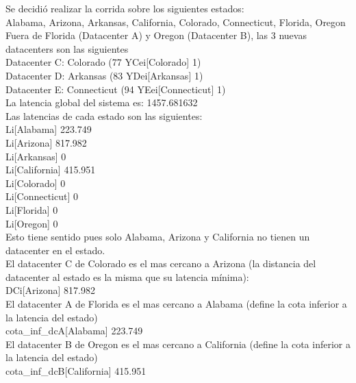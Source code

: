 \documentclass{article}
\begin{document}
Se decidi\'o realizar la corrida sobre los siguientes estados:
\smallskip\\
Alabama, Arizona, Arkansas, California, Colorado, Connecticut, Florida, Oregon
\bigskip\\
Fuera de Florida (Datacenter A) y Oregon (Datacenter B), las 3 nuevas datacenters son las siguientes
\bigskip\\
Datacenter C: Colorado        (77 YCei[Colorado]      1)
\smallskip\\
Datacenter D: Arkansas        (83 YDei[Arkansas]      1)     	
\smallskip\\
Datacenter E: Connecticut     (94 YEei[Connecticut]   1)   
\bigskip\\
La latencia global del sistema es: 1457.681632
\bigskip\\
Las latencias de cada estado son las siguientes:
\bigskip\\
Li[Alabama]       223.749        
\smallskip\\     
Li[Arizona]       817.982       
\smallskip\\      
Li[Arkansas]      0            
\smallskip\\ 
Li[California]    415.951     
\smallskip\\  
Li[Colorado]      0         
\smallskip\\    
Li[Connecticut]   0     
\smallskip\\        
Li[Florida]       0   
\smallskip\\          
Li[Oregon]        0             
\bigskip\\
Esto tiene sentido pues solo Alabama, Arizona y California no tienen un datacenter en el estado.
\bigskip\\
El datacenter C de Colorado es el mas cercano a Arizona (la distancia del datacenter al estado es la misma que su latencia m\'inima):
\smallskip\\
DCi[Arizona]          817.982 
\bigskip\\
El datacenter A de Florida es el mas cercano a Alabama (define la cota inferior a la latencia del estado) 
\smallskip\\
cota_inf_dcA[Alabama]   223.749  
\bigskip\\
El datacenter B de Oregon es el mas cercano a California (define la cota inferior a la latencia del estado) 
\smallskip\\
cota_inf_dcB[California] 415.951 
\bigskip\\


\newpage
\end{document}
